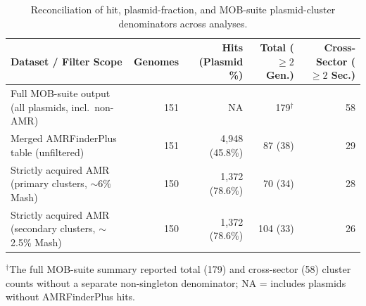 \documentclass[11pt,a4paper]{article}
\begin{document}
\begin{table}[!htbp]
\centering
\caption{Reconciliation of hit, plasmid-fraction, and MOB-suite plasmid-cluster denominators across analyses.}
\label{tab:accounting}
\footnotesize
\setlength{\tabcolsep}{4.5pt}
\begin{tabularx}{\linewidth}{@{}X r r r r@{}}
\toprule
\textbf{Dataset / Filter Scope} & \textbf{Genomes} & \textbf{Hits (Plasmid \%)} & \textbf{Total ($\ge 2$ Gen.)} & \textbf{Cross-Sector ($\ge 2$ Sec.)} \\
\midrule
Full MOB-suite output (all plasmids, incl.\ non-AMR) & 151 & NA & 179$^{\dagger}$ & 58 \\
Merged AMRFinderPlus table (unfiltered) & 151 & 4,948 (45.8\%) & 87 (38) & 29 \\
Strictly acquired AMR (primary clusters, $\sim$6\% Mash) & 150 & 1,372 (78.6\%) & 70 (34) & 28 \\
Strictly acquired AMR (secondary clusters, $\sim$2.5\% Mash) & 150 & 1,372 (78.6\%) & 104 (33) & 26 \\
\bottomrule
\end{tabularx}
\vspace{2pt}
\raggedright\footnotesize{$^{\dagger}$The full MOB-suite summary reported total (179) and cross-sector (58) cluster counts without a separate non-singleton denominator; NA = includes plasmids without AMRFinderPlus hits.}
\end{table}
\end{document}
